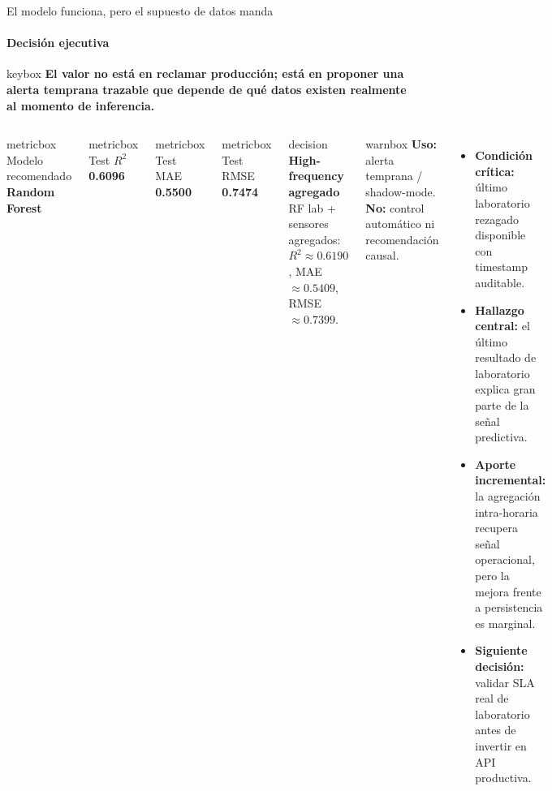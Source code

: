 \documentclass[aspectratio=169,10pt]{beamer}
\newcommand{\keymessage}[1]{%
  \vspace{-0.05cm}
  \begin{beamercolorbox}[wd=\textwidth,sep=0.62em,rounded=true]{keybox}
  \textbf{#1}
  \end{beamercolorbox}\vspace{0.10cm}
}
\newcommand{\metriccard}[3]{%
\begin{minipage}[t]{0.31\textwidth}
\centering
\begin{beamercolorbox}[wd=\textwidth,sep=0.65em,rounded=true]{metricbox}
{\scriptsize\color{MinsurGray}#1}\\[-0.02cm]
{\Large\bfseries\textcolor{#3}{#2}}
\end{beamercolorbox}
\end{minipage}}
\begin{document}
\begin{frame}{El modelo funciona, pero el supuesto de datos manda}
\framesubtitle{Decisión ejecutiva}
\keymessage{El valor no está en reclamar producción; está en proponer una alerta temprana trazable que depende de qué datos existen realmente al momento de inferencia.}
\begin{columns}[T]
\begin{beamercolorbox}[wd=\textwidth,sep=0.7em,rounded=true]{metricbox}
{\scriptsize\color{MinsurGray}Modelo recomendado}\\[-0.02cm]
{\Large\bfseries\textcolor{MinsurBlue}{Random Forest}}
\end{beamercolorbox}
\vspace{0.12cm}
\metriccard{Test $R^2$}{0.6096}{MinsurGreen}\hfill
\metriccard{Test MAE}{0.5500}{MinsurGreen}\hfill
\metriccard{Test RMSE}{0.7474}{MinsurGreen}
\vspace{0.22cm}
\begin{beamercolorbox}[wd=\textwidth,sep=0.7em,rounded=true]{decision}
\textbf{High-frequency agregado}\newline
RF lab + sensores agregados: $R^2 \approx 0.6190$, MAE $\approx 0.5409$, RMSE $\approx 0.7399$.
\end{beamercolorbox}
\vspace{0.15cm}
\begin{beamercolorbox}[wd=\textwidth,sep=0.7em,rounded=true]{warnbox}
\textbf{Uso:} alerta temprana / shadow-mode. \textbf{No:} control automático ni recomendación causal.
\end{beamercolorbox}
\begin{itemize}
  \item \textbf{Condición crítica:} último laboratorio rezagado disponible con timestamp auditable.
  \item \textbf{Hallazgo central:} el último resultado de laboratorio explica gran parte de la señal predictiva.
  \item \textbf{Aporte incremental:} la agregación intra-horaria recupera señal operacional, pero la mejora frente a persistencia es marginal.
  \item \textbf{Siguiente decisión:} validar SLA real de laboratorio antes de invertir en API productiva.
\end{itemize}
\end{columns}
\end{frame}
\end{document}

